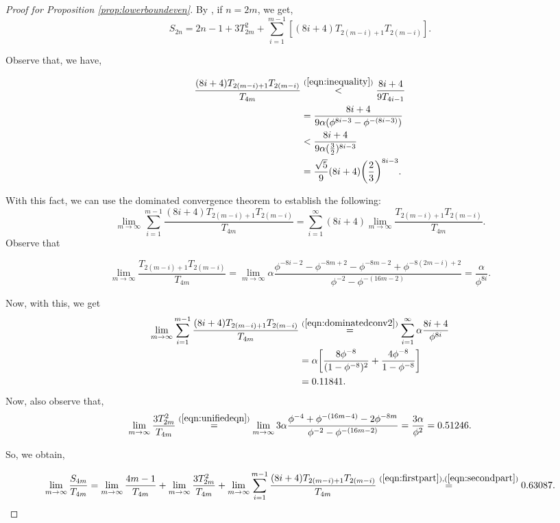 \documentclass{amsart}
\theoremstyle{definition}
\newcommand{\yandi}[1]{\marginpar{\tiny \color{red} Yandi: #1}}
\begin{document}
\begin{proof}[Proof for Proposition \ref{prop:lowerboundeven}]
    By , if $n = 2m$, we get, 
\[ S_{2n}= 2n-1+ 3T_{2m}^2 +\sum_{i=1}^{m-1}[(8i+4)T_{2(m-i)+1}T_{2(m-i)}] .\]

Observe that, we have, 

\begin{align*}
    \frac{(8i + 4)T_{2(m - i) + 1}T_{2(m - i)}}{T_{4m}}  &\stackrel{(\ref{eqn:inequality})}{<} \frac{8i + 4}{9T_{4i - 1}} \\
    &= \frac{8i + 4}{9\alpha(\phi^{8i - 3} - \phi^{-(8i - 3)})} \\
    &< \frac{8i + 4}{9\alpha(\frac{3}{2})^{8i - 3}} \\
    &= \frac{\sqrt{5}}{9}(8i + 4)\bigg(\frac{2}{3}\bigg)^{8i - 3}.
\end{align*}


With this fact, we can use the dominated convergence theorem to establish the following: 
\begin{equation}\label{eqn:dominatedconv2}
    \lim_{m \to \infty} \sum_{i = 1}^{m - 1} \frac{(8i + 4)T_{2(m - i) + 1}T_{2(m - i)}}{T_{4m}} = \sum_{i = 1}^{\infty} (8i + 4) \lim_{m \to \infty} \frac{T_{2(m - i) + 1}T_{2(m - i)}}{T_{4m}}.
\end{equation}
Observe that 

\[\lim_{m \to \infty} \frac{T_{2(m - i) + 1}T_{2(m - i)}}{T_{4m}} = \lim_{m \to \infty} \alpha\frac{\phi^{-8i - 2} - \phi^{-8m + 2} - \phi^{-8m - 2} + \phi^{-8(2m - i)+2}}{\phi^{-2} - \phi^{-(16m - 2)}} = \frac{\alpha}{\phi^{8i}}.\]

Now, with this, we get 
\begin{equation}\label{eqn:firstpart}
\begin{aligned}
    \lim_{m \to \infty} \sum_{i = 1}^{m - 1} \frac{(8i + 4)T_{2(m - i) + 1}T_{2(m - i)}}{T_{4m}} 
    &\stackrel{(\ref{eqn:dominatedconv2})}{=} \sum_{i = 1}^{\infty} \alpha\frac{8i + 4}{\phi^{8i}} \\ 
    &= \alpha\bigg[\frac{8\phi^{-8}}{(1 - \phi^{-8})^2} + \frac{4\phi^{-8}}{1 - \phi^{-8}}\bigg] \\ 
    &= 0.11841.
\end{aligned} 
\end{equation}
Now, also observe that,
\begin{equation}\label{eqn:secondpart}
    \lim_{m \to \infty} \frac{3T_{2m}^2}{T_{4m}} \stackrel{(\ref{eqn:unifiedeqn})}{=} \lim_{m \to \infty} 3 \alpha \frac{\phi^{-4} + \phi^{-(16m - 4)} - 2\phi^{-8m}}{\phi^{-2} - \phi^{-(16m - 2)}} = \frac{3\alpha}{\phi^2} = 0.51246.
\end{equation}

So, we obtain, 

\[\lim_{m \to \infty} \frac{S_{4m}}{T_{4m}} = \lim_{m \to \infty} \frac{4m - 1}{T_{4m}} + \lim_{m \to \infty}\frac{3T_{2m}^2}{T_{4m}} + \lim_{m \to \infty} \sum_{i = 1}^{m - 1} \frac{(8i + 4)T_{2(m - i) + 1}T_{2(m - i)}}{T_{4m}} \stackrel{(\ref{eqn:firstpart}), (\ref{eqn:secondpart})}{=} 0.63087.\]
\end{proof}
\end{document}
